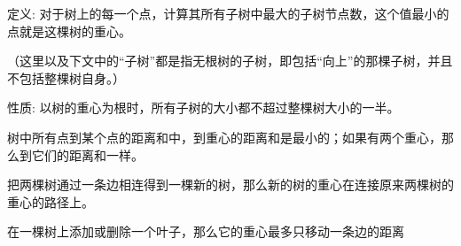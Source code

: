 定义: 对于树上的每一个点，计算其所有子树中最大的子树节点数，这个值最小的点就是这棵树的重心。

（这里以及下文中的“子树”都是指无根树的子树，即包括“向上”的那棵子树，并且不包括整棵树自身。）

性质: 以树的重心为根时，所有子树的大小都不超过整棵树大小的一半。

树中所有点到某个点的距离和中，到重心的距离和是最小的；如果有两个重心，那么到它们的距离和一样。

把两棵树通过一条边相连得到一棵新的树，那么新的树的重心在连接原来两棵树的重心的路径上。

在一棵树上添加或删除一个叶子，那么它的重心最多只移动一条边的距离